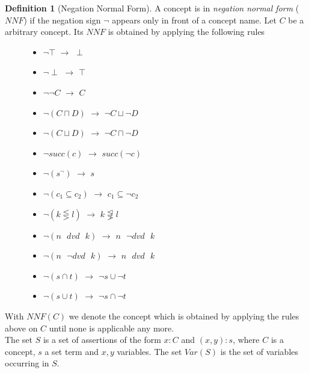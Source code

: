 \documentclass[a4paper,11pt]{scrartcl}
\theoremstyle{break}
\theoremstyle{definition}
\newtheorem{mydef}{Definition}
\begin{document}
\begin{mydef}[Negation Normal Form]
A concept is in \textit{negation normal form} ($NNF$) if the negation sign $\neg$ appears only in front of a concept name. Let $C$ be a arbitrary concept. Its $NNF$ is obtained by applying the following rules
\begin{figure}[H]
\begin{minipage}[t]{.5\textwidth}
\raggedright
\begin{itemize}
\item $\neg\top$ $\rightarrow$ $\perp$
\item $\neg\perp$ $\rightarrow$ $\top$
\item $\neg\neg C$ $\rightarrow$ $C$
\item $\neg(C\sqcap D)$ $\rightarrow$ $\neg C \sqcup \neg D$
\item $\neg(C\sqcup D)$ $\rightarrow$ $\neg C \sqcap \neg D$
\item $\neg succ(c)$ $\rightarrow$ $succ(\neg c)$
\item $\neg (s^\neg)$ $\rightarrow$ $s$
\end{itemize}
\end{minipage}%
\begin{minipage}[t]{.5\textwidth}
\raggedleft
\begin{itemize}
\item $\neg (c_1\subseteq c_2)$ $\rightarrow$ $c_1\subseteq \neg c_2$
\item $\neg (k\lesseqgtr l)$ $\rightarrow$ $k\not\lesseqgtr l$
\item $\neg (n\text{ } dvd \text{ } k)$ $\rightarrow$ $n\text{ } \neg dvd \text{ } k$
\item $\neg (n\text{ } \neg dvd \text{ } k)$ $\rightarrow$ $n\text{ } dvd \text{ } k$
\item $\neg (s\cap t)$ $\rightarrow$ $\neg s \cup \neg t$
\item $\neg (s\cup t)$ $\rightarrow$ $\neg s \cap \neg t$
\end{itemize}
\end{minipage}
\end{figure}
\end{mydef}
With $NNF(C)$ we denote the concept which is obtained by applying the rules above on $C$ until none is applicable any more.\\
The set $S$ is a set of assertions of the form $x:C$ and $(x,y):s$, where $C$ is a concept, $s$ a set term and $x,y$ variables. The set $Var(S)$ is the set of variables occurring in $S$.
\end{document}
